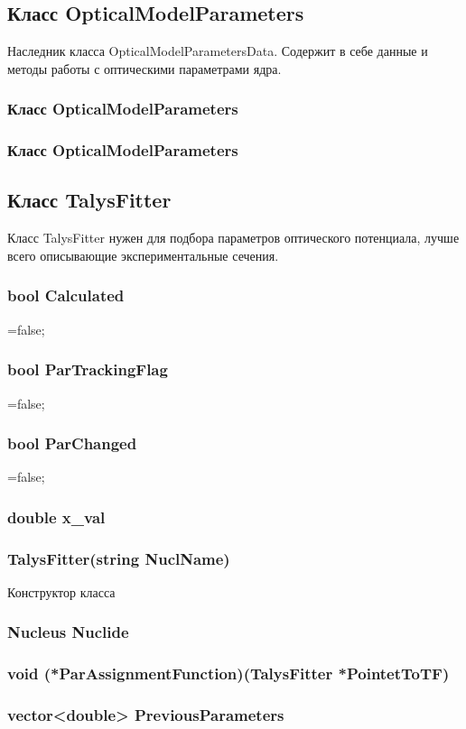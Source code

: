 \documentclass[a4paper,12pt]{extarticle}
\begin{document}
\subsection{Класс OpticalModelParameters}
Наследник класса OpticalModelParametersData. Содержит в себе данные и методы работы с оптическими параметрами ядра.
\subsubsection{Класс OpticalModelParameters}
\subsubsection{Класс OpticalModelParameters}
\subsection{Класс TalysFitter}
Класс TalysFitter нужен для подбора параметров оптического потенциала, лучше всего описывающие экспериментальные сечения. 
\subsubsection{bool Calculated}
=false;
\subsubsection{bool ParTrackingFlag}
=false;
\subsubsection{bool ParChanged}
=false;
\subsubsection{double x_val}

\subsubsection{TalysFitter(string NuclName)}
Конструктор класса
\subsubsection{Nucleus Nuclide}

\subsubsection{void (*ParAssignmentFunction)(TalysFitter *PointetToTF)}
\subsubsection{vector<double> PreviousParameters}
\end{document}
